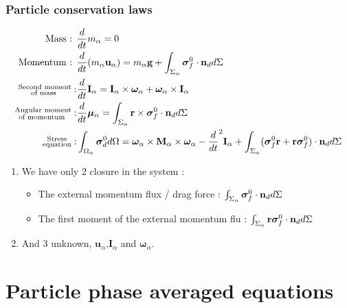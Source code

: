 \documentclass{sintefbeamer}
\begin{document}
\begin{frame}
  \frametitle{Particle conservation laws }
\begin{align*} 
  \text{Mass :   }
  &
  \frac{d}{d t} m_\alpha
  = 
  0\\
  \text{Momentum :   }
  &
  \frac{d}{d t} (m_\alpha \textbf{u}_\alpha )
  = 
  m_\alpha \textbf{g}  
  + \int_{\Sigma_\alpha} \bm{\sigma}_f^0 \cdot \textbf{n}_d d\Sigma
  \\
  \substack{\text{Second moment} \\ \text{of mass }} : 
  &
  \frac{d}{d t} \textbf{I}_\alpha
  = \textbf{I}_\alpha \times \bm\omega_\alpha+ \bm\omega_\alpha \times \textbf{I}_\alpha \\
  \substack{\text{Angular moment} \\ \text{of momentum }} : 
  &
  \frac{d}{d t} \bm\mu_\alpha
  =  
  \int_{\Sigma_\alpha}  \textbf{r}\times\bm{\sigma}_f^0\cdot \textbf{n}_d d\Sigma
  \\
  \substack{\text{Stress} \\ \text{equation}} : 
  &
  \int_{\Omega_\alpha} \bm{\sigma}_d^0  d\Omega
  =  \bm\omega_\alpha \times \textbf{M}_\alpha\times \bm\omega_\alpha
  - \frac{d}{d t}^2 \textbf{I}_\alpha
  + \int_{\Sigma_\alpha} ( \bm{\sigma}_f^0 \textbf{r}+  \textbf{r}\bm{\sigma}_f^0) \cdot \textbf{n}_d d\Sigma
\end{align*}
  
\begin{enumerate}
  \item We have only $2$ closure in the system : 
  \begin{itemize}
    \item The external momentum flux / drag force : 
    $\int_{\Sigma_\alpha} \bm{\sigma}_f^0 \cdot \textbf{n}_d d\Sigma$
    \item The first moment of the external momentum flu : 
    $\int_{\Sigma_\alpha}  \textbf{r}\bm{\sigma}_f^0\cdot \textbf{n}_d d\Sigma$
  \end{itemize}
  \item And 3 unknown, $\textbf{u}_\alpha$,$\textbf{I}_\alpha$ and $\bm\omega_\alpha$.
\end{enumerate}


\end{frame}


\section{Particle phase averaged equations}
\section*{}
\end{document}
